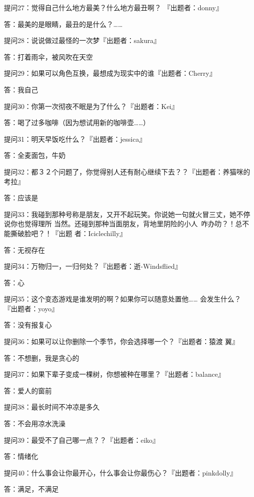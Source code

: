 \documentclass[12pt,a4paper]{article}
\def\blankrev{\vspace{1ex}}									%
\begin{document}
		\blankrev
		提问27：觉得自己什么地方最美？什么地方最丑啊？ 『出题者：donny』\par
		答：最美的是眼睛，最丑的是什么？……

		\blankrev
		提问28：说说做过最怪的一次梦『出题者：sakura』\par
		答：打着雨伞，被风吹在天空

		\blankrev
		提问29：如果可以角色互换，最想成为现实中的谁『出题者：Cherry』\par
		答：我自己

		\blankrev
		提问30：你第一次彻夜不眠是为了什么？『出题者：Kei』\par
		答：喝了过多咖啡（因为想试用新的咖啡壶……）

		\blankrev
		提问31：明天早饭吃什么？『出题者：jessica』\par
		答：全麦面包，牛奶

		\blankrev
		提问32：都３２个问题了，你觉得别人还有耐心继续下去？？『出题者：养猫咪的考拉』\par
		答：应该是

		\blankrev
		提问33：我碰到那种号称是朋友，又开不起玩笑。你说她一句就火冒三丈，她不停说你也觉得理所
				当然。还碰到那种当面朋友，背地里阴险的小人~咋办叻？！总不能撕破脸吧？！『出题
				者：Iciclechilly』\par
		答：无视存在

		\blankrev
		提问34：万物归一，一归何处？『出题者：逝-Windsflied』\par
		答：心

		\blankrev
		提问35：这个变态游戏是谁发明的啊？如果你可以随意处置他…… 会发生什么？ 『出题者：yoyo』\par
		答：没有报复心

		\blankrev
		提问36：如果可以让你删除一个季节，你会选择哪一个？『出题者：猿渡 翼』\par
		答：不想删，我是贪心的

		\blankrev
		提问37：如果下辈子变成一棵树，你想被种在哪里？『出题者：balance』\par
		答：爱人的窗前

		\blankrev
		提问38：最长时间不冲凉是多久\par
		答：不会用凉水洗澡

		\blankrev
		提问39：最受不了自己哪一点？？『出题者：eiko』\par
		答：情绪化

		\blankrev
		提问40：什么事会让你最开心，什么事会让你最伤心？『出题者：pinkdolly』\par
		答：满足，不满足
\end{document}
